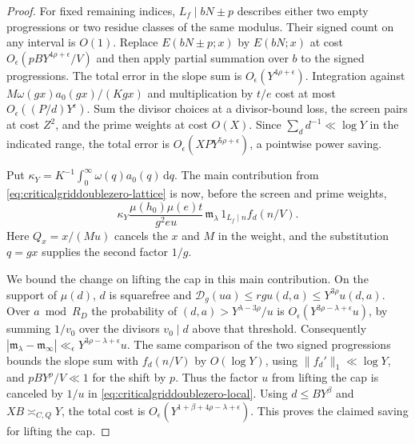 \documentclass[11pt,a4paper]{article}
\numberwithin{equation}{section}
\newcommand{\ud}{\mathrm d}
\begin{document}
\begin{proof}
For fixed remaining indices, $L_f\mid bN\pm p$ describes
either two empty progressions or two residue classes
of the same modulus. Their signed count on any interval
is $O(1)$. Replace $E(bN\pm p;x)$ by $E(bN;x)$ at cost
$O_\epsilon(pB Y^{4\rho+\epsilon}/V)$ and then apply
partial summation over $b$ to the signed progressions.
The total error in the slope sum is
$O_\epsilon(Y^{4\rho+\epsilon})$.
Integration against $M\omega(gx)a_0(gx)/(K g x)$
and multiplication by $t/e$ cost at most
$O_\epsilon((P/d)Y^\epsilon)$.
Sum the divisor choices at a divisor-bound loss, the
screen pairs at cost $Z^2$, and the prime weights at
cost $O(X)$. Since $\sum_d d^{-1}\ll\log Y$ in the
indicated range, the total error is
$O_\epsilon(XP Y^{5\rho+\epsilon})$, a pointwise
power saving.

Put $\kappa_Y=K^{-1}\int_0^\infty\omega(q)a_0(q)\,\ud q$.
The main contribution from \cref{eq:criticalgriddoublezero-lattice}
is now, before the screen and prime weights,
\begin{equation}
 \kappa_Y\frac{\mu(h_0)\mu(e)t}{g^2 e u}\,
        \mathfrak m_\lambda\,1_{L_f\mid n} f_d(n/V).
 \label{eq:criticalgriddoublezero-local}
\end{equation}
Here $Q_x=x/(M u)$ cancels the $x$ and $M$ in the
weight, and the substitution $q=gx$ supplies the
second factor $1/g$.

We bound the change on lifting the cap in this main
contribution. On the support of $\mu(d)$, $d$ is
squarefree and
$\mathcal D_g(ua)\le r g u(d,a)\le Y^{3\rho}u(d,a)$.
Over $a\bmod R_D$ the probability of
$(d,a)>Y^{\lambda-3\rho}/u$ is
$O_\epsilon(Y^{3\rho-\lambda+\epsilon}u)$, by summing
$1/v_0$ over the divisors $v_0\mid d$ above that threshold.
Consequently
$|\mathfrak m_\lambda-\mathfrak m_\infty|
 \ll_\epsilon Y^{3\rho-\lambda+\epsilon}u$.
The same comparison of the two signed progressions
bounds the slope sum with $f_d(n/V)$ by $O(\log Y)$,
using $\|f_d'\|_1\ll\log Y$, and
$pBY^\rho/V\ll1$ for the shift by $p$.
Thus the factor $u$ from lifting the cap is canceled
by $1/u$ in \cref{eq:criticalgriddoublezero-local}.
Using $d\le B Y^\beta$ and $XB\asymp_{C,Q}Y$, the
total cost is
$O_\epsilon(Y^{1+\beta+4\rho-\lambda+\epsilon})$.
This proves the claimed saving for lifting the cap.


\end{proof}
\end{document}

